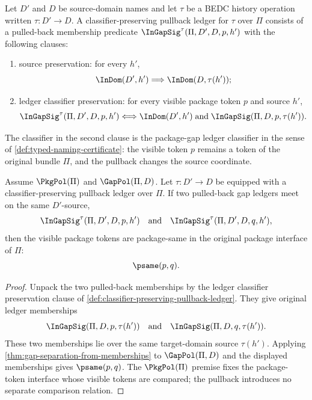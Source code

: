 \begin{definition}
\label{def:classifier-preserving-pullback-ledger}
Let $D'$ and $D$ be source-domain names and let $\tau$ be a BEDC history operation written $\tau:D'\to D$. A classifier-preserving pullback ledger for $\tau$ over $\Pi$ consists of a pulled-back membership predicate ${\InGapSig}^{\tau}(\Pi,D',D,p,h')$ with the following clauses:
\begin{enumerate}
  \item source preservation: for every $h'$,
  $$
    \InDom(D',h')\Longrightarrow\InDom(D,\tau(h'));
  $$
  \item ledger classifier preservation: for every visible package token $p$ and source $h'$,
  $$
    {\InGapSig}^{\tau}(\Pi,D',D,p,h')
    \Longleftrightarrow
    \InDom(D',h')\;\text{and}\;\InGapSig(\Pi,D,p,\tau(h')).
  $$
\end{enumerate}
The classifier in the second clause is the package-gap ledger classifier in the sense of \autoref{def:typed-naming-certificate}: the visible token $p$ remains a token of the original bundle $\Pi$, and the pullback changes the source coordinate.
\end{definition}

\begin{theorem}
\label{thm:package-token-pullback-separation}
Assume $\PkgPol(\Pi)$ and $\GapPol(\Pi,D)$. Let $\tau:D'\to D$ be equipped with a classifier-preserving pullback ledger over $\Pi$. If two pulled-back gap ledgers meet on the same $D'$-source,
$$
  {\InGapSig}^{\tau}(\Pi,D',D,p,h')
  \quad\text{and}\quad
  {\InGapSig}^{\tau}(\Pi,D',D,q,h'),
$$
then the visible package tokens are package-same in the original package interface of $\Pi$:
$$
  \psame(p,q).
$$
\end{theorem}

\begin{proof}
Unpack the two pulled-back memberships by the ledger classifier preservation clause of \autoref{def:classifier-preserving-pullback-ledger}. They give original ledger memberships
$$
  \InGapSig(\Pi,D,p,\tau(h'))
  \quad\text{and}\quad
  \InGapSig(\Pi,D,q,\tau(h')).
$$
These two memberships lie over the same target-domain source $\tau(h')$. Applying \autoref{thm:gap-separation-from-memberships} to $\GapPol(\Pi,D)$ and the displayed memberships gives $\psame(p,q)$. The $\PkgPol(\Pi)$ premise fixes the package-token interface whose visible tokens are compared; the pullback introduces no separate comparison relation.
\end{proof}

